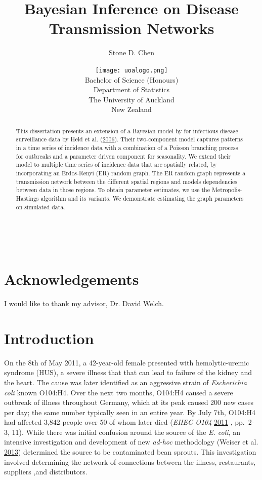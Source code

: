 \documentclass[11pt,a4paper]{article}
\title{\vspace{3cm}\Huge{Bayesian Inference on Disease Transmission Networks}}
\author{\Large{Stone D. Chen}}
\date
{
    \vspace{5cm}
    \protect\texttt{[image: uoalogo.png]}\\
    \vspace{1.5cm}
    Bachelor of Science (Honours)\\
    Department of Statistics\\
    The University of Auckland\\
    New Zealand
}
\begin{document}
\begin{titlingpage}
\maketitle
\end{titlingpage}

\ 
\newpage
{}

\section*{Acknowledgements}
I would like to thank my advisor, Dr. David Welch.
\newpage


\tableofcontents
\newpage




\begin{abstract}
This dissertation presents an extension of a Bayesian model by for
infectious disease surveillance data by Held et al.
(\protect\hyperlink{ref-held_two-component_2006}{2006}). Their
two-component model captures patterns in a time series of incidence data
with a combination of a Poisson branching process for outbreaks and a
parameter driven component for seasonality. We extend their model to
multiple time series of incidence data that are spatially related, by
incorporating an Erdos-Renyi (ER) random graph. The ER random graph
represents a transmission network between the different spatial regions
and models dependencies between data in those regions. To obtain
parameter estimates, we use the Metropolis-Hastings algorithm and its
variants. We demonstrate estimating the graph parameters on simulated
data.
\end{abstract}

\hypertarget{introduction}{%
\section{Introduction}\label{introduction}}

On the 8th of May 2011, a 42-year-old female presented with
hemolytic-uremic syndrome (HUS), a severe illness that that can lead to
failure of the kidney and the heart. The cause was later identified as
an aggressive strain of \emph{Escherichia coli} known O104:H4. Over the
next two months, O104:H4 caused a severe outbreak of illness throughout
Germany, which at its peak caused 200 new cases per day; the same number
typically seen in an entire year. By July 7th, O104:H4 had affected
3,842 people over 50 of whom later died (\emph{EHEC O104}
\protect\hyperlink{ref-noauthor_ehec_2011}{2011} , pp.~2-3, 11). While
there was initial confusion around the source of the \emph{E. coli}, an
intensive investigation and development of new \emph{ad-hoc} methodology
(Weiser et al. \protect\hyperlink{ref-weiser_trace-back_2013}{2013})
determined the source to be contaminated bean sprouts. This
investigation involved determining the network of connections between
the illness, restaurants, suppliers ,and distributors.
\end{document}
